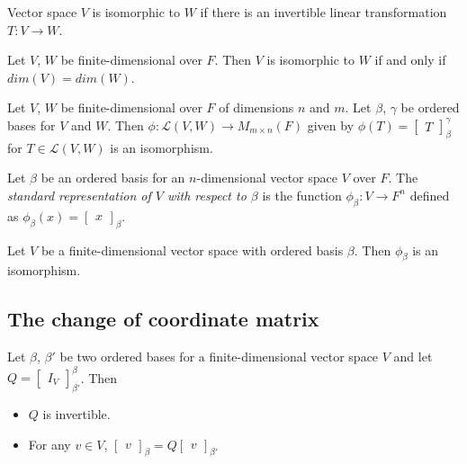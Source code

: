 \documentclass[12pt]{article}
\newenvironment{theorem}[2][Theorem]{\begin{trivlist}
\item[\hskip \labelsep {\bfseries #1}\hskip \labelsep {\bfseries #2.}]}{\end{trivlist}}
\newenvironment{definition}[2][Definition]{\begin{trivlist}
\item[\hskip \labelsep {\bfseries #1}\hskip \labelsep {\bfseries #2}]}{\end{trivlist}}
\begin{document}
\begin{definition}{8}
Vector space $V$ is isomorphic to $W$ if there is an invertible linear transformation $T : V \to W$.
\end{definition}

\begin{theorem}{2.19}
Let $V$, $W$ be finite-dimensional over $F$. Then $V$ is isomorphic to $W$ if and only if $dim(V) = dim(W)$.
\end{theorem}

\begin{theorem}{2.20}
Let $V$, $W$ be finite-dimensional over $F$ of dimensions $n$ and $m$. Let $\beta$, $\gamma$ be ordered bases for $V$ and $W$. Then $\phi : \mathcal{L}(V, W) \to M_{m \times n}(F)$ given by $\phi(T) = \begin{bmatrix} T \end{bmatrix}_\beta^\gamma$ for $T \in \mathcal{L}(V, W)$ is an isomorphism.
\end{theorem}

\begin{definition}{9}
Let $\beta$ be an ordered basis for an $n$-dimensional vector space $V$ over $F$. The \textit{standard representation of $V$ with respect to $\beta$} is the function $\phi_\beta : V \to F^n$ defined as $\phi_\beta(x) = \begin{bmatrix} x \end{bmatrix}_\beta$.
\end{definition}

\begin{theorem}{2.21}
Let $V$ be a finite-dimensional vector space with ordered basis $\beta$. Then $\phi_\beta$ is an isomorphism.
\end{theorem}

\subsection{The change of coordinate matrix}

\begin{theorem}{2.22}
Let $\beta$, $\beta'$ be two ordered bases for a finite-dimensional vector space $V$ and let $Q = \begin{bmatrix} I_V \end{bmatrix}_{\beta'}^\beta$. Then

\begin{itemize}
    \item[(a)] $Q$ is invertible.
    
    \item[(b)] For any $v \in V$, $\begin{bmatrix} v \end{bmatrix}_\beta = Q\begin{bmatrix} v \end{bmatrix}_{\beta'}$
\end{itemize}
\end{theorem}
\end{document}
